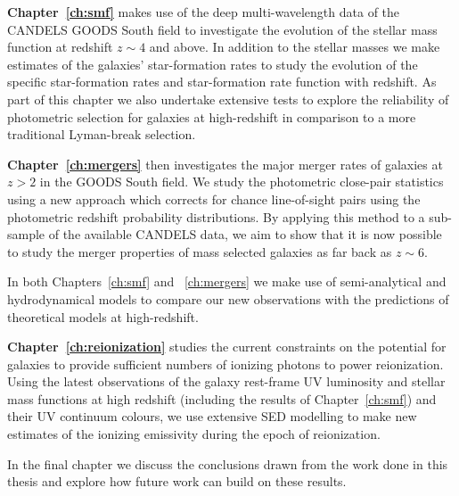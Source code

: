 {\bf Chapter~\ref{ch:smf}} makes use of the deep multi-wavelength data of the CANDELS GOODS South field to investigate the evolution of the stellar mass function at redshift $z\sim4$ and above. In addition to the stellar masses we make estimates of the galaxies' star-formation rates to study the evolution of the specific star-formation rates and star-formation rate function with redshift. As part of this chapter we also undertake extensive tests to explore the reliability of photometric selection for galaxies at high-redshift in comparison to a more traditional Lyman-break selection.

{\bf Chapter~\ref{ch:mergers}} then investigates the major merger rates of galaxies at $z > 2$ in the GOODS South field. We study the photometric close-pair statistics using a new approach which corrects for chance line-of-sight pairs using the photometric redshift probability distributions. By applying this method to a sub-sample of the available CANDELS data, we aim to show that it is now possible to study the merger properties of mass selected galaxies as far back as $z\sim6$.

In both Chapters~\ref{ch:smf} and ~\ref{ch:mergers} we make use of semi-analytical and hydrodynamical models to compare our new observations with the predictions of theoretical models at high-redshift.

{\bf Chapter~\ref{ch:reionization}} studies the current constraints on the potential for galaxies to provide sufficient numbers of ionizing photons to power reionization. Using the latest observations of the galaxy rest-frame UV luminosity and stellar mass functions at high redshift (including the results of Chapter~\ref{ch:smf}) and their UV continuum colours, we use extensive SED modelling to make new estimates of the ionizing emissivity during the epoch of reionization.

In the final chapter we discuss the conclusions drawn from the work done in this thesis and explore how future work can build on these results.
